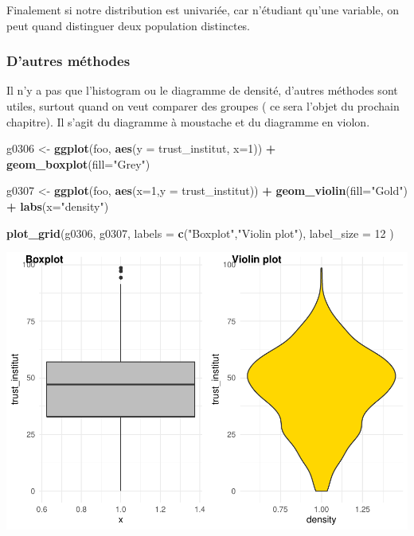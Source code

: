 \documentclass[
]{book}
\newenvironment{Shaded}{\begin{snugshade}}{\end{snugshade}}
\newcommand{\DataTypeTok}[1]{\textcolor[rgb]{0.13,0.29,0.53}{#1}}
\newcommand{\DecValTok}[1]{\textcolor[rgb]{0.00,0.00,0.81}{#1}}
\newcommand{\KeywordTok}[1]{\textcolor[rgb]{0.13,0.29,0.53}{\textbf{#1}}}
\newcommand{\NormalTok}[1]{#1}
\newcommand{\OperatorTok}[1]{\textcolor[rgb]{0.81,0.36,0.00}{\textbf{#1}}}
\newcommand{\StringTok}[1]{\textcolor[rgb]{0.31,0.60,0.02}{#1}}
\begin{document}
Finalement si notre distribution est univariée, car n'étudiant qu'une variable, on peut quand distinguer deux population distinctes.

\hypertarget{dautres-muxe9thodes}{%
\subsubsection{D'autres méthodes}\label{dautres-muxe9thodes}}

Il n'y a pas que l'histogram ou le diagramme de densité, d'autres méthodes sont utiles, surtout quand on veut comparer des groupes ( ce sera l'objet du prochain chapitre). Il s'agit du diagramme à moustache et du diagramme en violon.

\begin{Shaded}
\begin{Highlighting}[]
\NormalTok{g0306 <-}\StringTok{ }\KeywordTok{ggplot}\NormalTok{(foo, }\KeywordTok{aes}\NormalTok{(}\DataTypeTok{y =}\NormalTok{ trust_institut, }\DataTypeTok{x=}\DecValTok{1}\NormalTok{)) }\OperatorTok{+}\StringTok{ }
\KeywordTok{geom_boxplot}\NormalTok{(}\DataTypeTok{fill=}\StringTok{"Grey"}\NormalTok{) }

\NormalTok{g0307 <-}\StringTok{ }\KeywordTok{ggplot}\NormalTok{(foo, }\KeywordTok{aes}\NormalTok{(}\DataTypeTok{x=}\DecValTok{1}\NormalTok{,}\DataTypeTok{y =}\NormalTok{ trust_institut)) }\OperatorTok{+}\StringTok{ }
\KeywordTok{geom_violin}\NormalTok{(}\DataTypeTok{fill=}\StringTok{"Gold"}\NormalTok{) }\OperatorTok{+}\StringTok{ }\KeywordTok{labs}\NormalTok{(}\DataTypeTok{x=}\StringTok{"density"}\NormalTok{)}

\KeywordTok{plot_grid}\NormalTok{(g0306, g0307, }\DataTypeTok{labels =} \KeywordTok{c}\NormalTok{(}\StringTok{"Boxplot"}\NormalTok{,}\StringTok{"Violin plot"}\NormalTok{),}
  \DataTypeTok{label_size =} \DecValTok{12}
\NormalTok{)}
\end{Highlighting}
\end{Shaded}

\includegraphics{bookdown-demo_files/figure-latex/308a-1.pdf}
\end{document}
